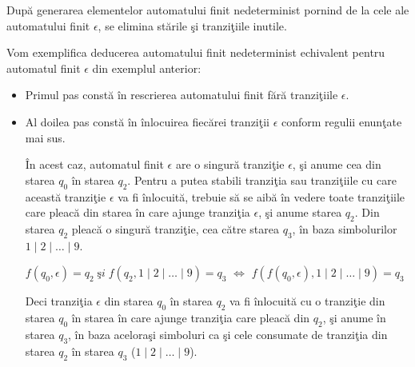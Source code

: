 După generarea elementelor automatului finit nedeterminist pornind de la cele ale automatului finit $\epsilon$, se elimina stările şi tranziţiile inutile.

Vom exemplifica deducerea automatului finit nedeterminist echivalent pentru automatul finit $\epsilon$ din exemplul anterior:

\begin{itemize}
\item
Primul pas constă în rescrierea automatului finit fără tranziţiile $\epsilon$.

\begin{figure}[H]
\centering
{}
\end{figure}

\item 
Al doilea pas constă în înlocuirea fiecărei tranziţii $\epsilon$ conform regulii enunţate mai sus. 

În acest caz, automatul finit $\epsilon$ are o singură tranziţie $\epsilon$, şi anume cea din starea $ q_0 $ în starea $ q_2 $. Pentru a putea stabili tranziţia sau tranziţiile cu care această tranziţie $\epsilon$ va fi înlocuită, trebuie să se aibă în vedere toate tranziţiile care pleacă din starea în care ajunge tranziţia $\epsilon$, şi anume starea $ q_2 $. Din starea $ q_2 $ pleacă o singură tranziţie, cea către starea $ q_3 $, în baza simbolurilor $1\mid2\mid\dots\mid9$. 

$ f(q_0, \epsilon) = q_2  \; şi \; f(q_2, 1\mid2\mid\dots\mid9) = q_3 $ $ \Leftrightarrow $ $ f(f(q_0, \epsilon),1\mid2\mid\dots\mid9) = q_3 $ 

Deci tranziţia $\epsilon$ din starea $ q_0 $ în starea $ q_2 $ va fi înlocuită cu o tranziţie din starea $ q_0 $ în starea în care ajunge tranziţia care pleacă din $ q_2 $, şi anume în starea $ q_3 $, în baza aceloraşi simboluri ca şi cele consumate de tranziţia din starea $ q_2 $ în starea $ q_3 $ ($1\mid2\mid\dots\mid9$).


\end{itemize}
